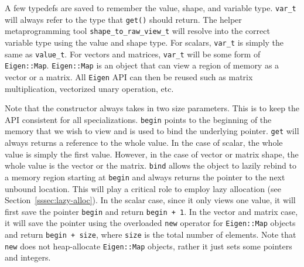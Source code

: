 A few typedefs are saved to remember the value, shape, and variable type.
\verb|var_t| will always refer to the type that \verb|get()| should return.
The helper metaprogramming tool \verb|shape_to_raw_view_t| will resolve into
the correct variable type using the value and shape type.
For scalars, \verb|var_t| is simply the same as \verb|value_t|.
For vectors and matrices, \verb|var_t| will be some form of \verb|Eigen::Map|.
\verb|Eigen::Map| is an object that can view a region of memory as a vector or a matrix.
All \verb|Eigen| API can then be reused such as 
matrix multiplication, vectorized unary operation, etc.

Note that the constructor always takes in two size parameters.
This is to keep the API consistent for all specializations.
\verb|begin| points to the beginning of the memory that we wish to view
and is used to bind the underlying pointer.
\verb|get| will always returns a reference to the whole value.
In the case of scalar, the whole value is simply the first value.
However, in the case of vector or matrix shape, the whole value is the vector or the matrix.
\verb|bind| allows the object to lazily rebind to a memory region
starting at \verb|begin| and always returns the pointer to the next unbound location.
This will play a critical role to employ lazy allocation (see Section~\ref{sssec:lazy-alloc}).
In the scalar case, since it only views one value, 
it will first save the pointer \verb|begin| and return \verb|begin + 1|.
In the vector and matrix case, it will save the pointer 
using the overloaded \verb|new| operator for \verb|Eigen::Map| objects and return \verb|begin + size|,
where \verb|size| is the total number of elements.
Note that \verb|new| does not heap-allocate \verb|Eigen::Map| objects, 
rather it just sets some pointers and integers.
